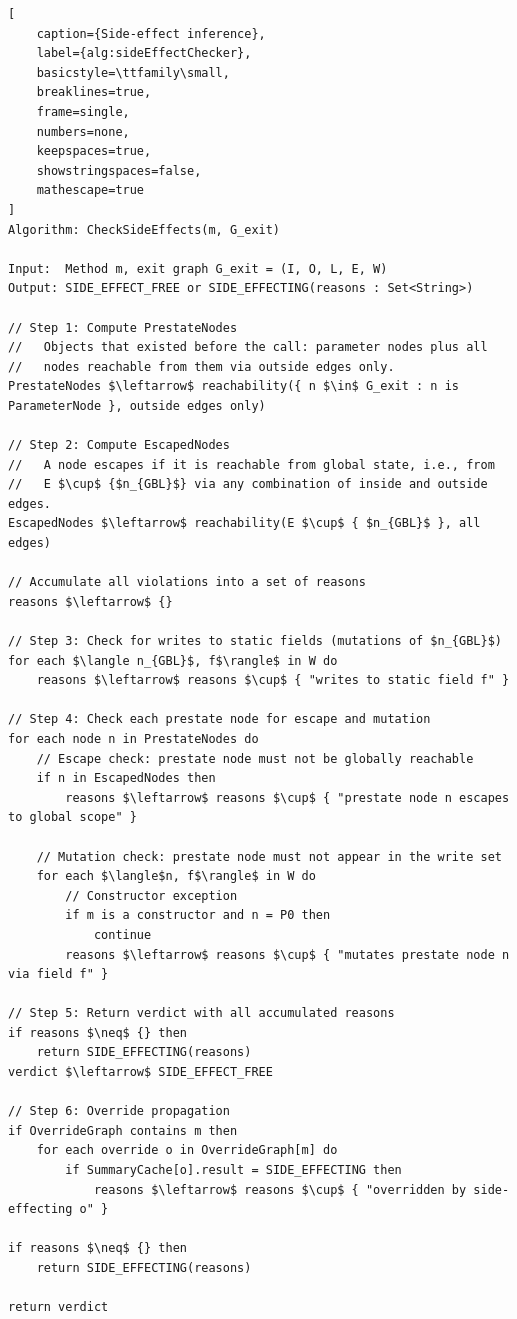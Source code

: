 \begin{lstlisting}[
    caption={Side-effect inference},
    label={alg:sideEffectChecker},
    basicstyle=\ttfamily\small,
    breaklines=true,
    frame=single,
    numbers=none,
    keepspaces=true,
    showstringspaces=false,
    mathescape=true
]
Algorithm: CheckSideEffects(m, G_exit)

Input:  Method m, exit graph G_exit = (I, O, L, E, W)
Output: SIDE_EFFECT_FREE or SIDE_EFFECTING(reasons : Set<String>)

// Step 1: Compute PrestateNodes
//   Objects that existed before the call: parameter nodes plus all
//   nodes reachable from them via outside edges only.
PrestateNodes $\leftarrow$ reachability({ n $\in$ G_exit : n is ParameterNode }, outside edges only)

// Step 2: Compute EscapedNodes
//   A node escapes if it is reachable from global state, i.e., from
//   E $\cup$ {$n_{GBL}$} via any combination of inside and outside edges.
EscapedNodes $\leftarrow$ reachability(E $\cup$ { $n_{GBL}$ }, all edges)

// Accumulate all violations into a set of reasons
reasons $\leftarrow$ {}

// Step 3: Check for writes to static fields (mutations of $n_{GBL}$)
for each $\langle n_{GBL}$, f$\rangle$ in W do
    reasons $\leftarrow$ reasons $\cup$ { "writes to static field f" }

// Step 4: Check each prestate node for escape and mutation
for each node n in PrestateNodes do
    // Escape check: prestate node must not be globally reachable
    if n in EscapedNodes then
        reasons $\leftarrow$ reasons $\cup$ { "prestate node n escapes to global scope" }

    // Mutation check: prestate node must not appear in the write set
    for each $\langle$n, f$\rangle$ in W do
        // Constructor exception
        if m is a constructor and n = P0 then
            continue
        reasons $\leftarrow$ reasons $\cup$ { "mutates prestate node n via field f" }

// Step 5: Return verdict with all accumulated reasons
if reasons $\neq$ {} then
    return SIDE_EFFECTING(reasons)
verdict $\leftarrow$ SIDE_EFFECT_FREE

// Step 6: Override propagation
if OverrideGraph contains m then
    for each override o in OverrideGraph[m] do
        if SummaryCache[o].result = SIDE_EFFECTING then
            reasons $\leftarrow$ reasons $\cup$ { "overridden by side-effecting o" }

if reasons $\neq$ {} then
    return SIDE_EFFECTING(reasons)

return verdict
\end{lstlisting}

